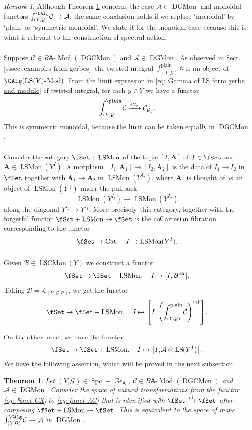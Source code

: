 \documentclass[10pt]{amsart}
\newcommand{\sssec}{\subsubsection}
\newtheorem{thm}[subsubsection]{Theorem}
\theoremstyle{remark}
\newtheorem{rmk}[subsubsection]{Remark}
\newcommand{\on}{\operatorname}
\newcommand{\cA}{\mathcal{A}}
\newcommand{\cB}{\mathcal{B}}
\newcommand{\cC}{\mathcal{C}}
\newcommand{\cG}{\mathcal{G}}
\newcommand{\cL}{\mathcal{L}}
\newcommand{\Cat}{\on{Cat}}
\newcommand{\LSMon}{\on{LSMon}}
\newcommand{\LSSymMon}{\on{LSCMon}}
\newcommand{\DGCatMon}{\on{DGMon}}
\newcommand{\DGCatSymMon}{\on{DGCMon}}
\newcommand{\lMod}{\text{-}\on{Mod}}
\newcommand{\LS}{\on{LS}}
\newcommand{\Spc}{\on{Spc}}
\newcommand{\id}{\on{id}}
\newcommand{\bA}{\mathbf{A}}
\newcommand{\sfA}{\mathsf{A}}
\begin{document}
\begin{rmk}
    Although Theorem \ref{thm: main categorical thm} concerns the case $\cA\in \DGCatMon$ and monoidal functors $\int^{\CAlg}_{(Y,\cG)}\cC\rightarrow\cA$, the same conclusion holds if we replace `monoidal' by `plain' or `symmetric monoidal'. We state it for the monoidal case because this is what is relevant to the construction of spectral action. 
\end{rmk}


\sssec{}
Suppose $\cC\in B\sfA\lMod(\DGCatSymMon)$ and $\cA\in \DGCatMon$. As observed in Sect. \ref{sssec: examples from gerbes}, the twisted integral $\int^{\on{plain}}_{(Y,\cG)}\cC$
is an object of $\CAlg(\LS(Y)\lMod)$. From the limit expression in \eqref{eq: Gamma of LS form gerbe and module} of twisted integral, for each $y\in Y$ we have a functor
\[\int^{\plain}_{(Y,\cG)}\cC\xrightarrow{\on{ev}_y}\cC_{\cG_y}.\]
This is symmetric monoidal, because the limit can be taken equally in $\DGCatSymMon$.


\sssec{}\label{sssec: fSet LSMon}
Consider the category $\fSet + \LSMon$ of the tuple $[I, \bA]$ of $I\in \fSet$ and $\bA\in \LSMon(Y^I)$. A morphism $[I_1, \bA_1]\rightarrow [I_2,\bA_2]$ is the data of $I_1\rightarrow I_2$ in $\fSet$ together with $\bA_1\rightarrow \bA_2$ in $\LSMon(Y^{I_2})$, where $\bA_1$ is thought of as an object of $\LSMon(Y^{I_2})$ under the pullback 
\[\LSMon(Y^{I_1})\rightarrow \LSMon(Y^{I_2})\]
along the diagonal $Y^{I_2}\rightarrow Y^{I_1}$. More precisely, this category, together with the forgetful functor $\fSet + \LSMon\rightarrow \fSet$ is the coCartesian fibration corresponding to the functor
\[\fSet\rightarrow \Cat,\quad I\mapsto \LSMon(Y^I).\]

\sssec{}\label{sssec: main cat thm prep}
Given $\cB\in \LSSymMon(Y)$ we construct a functor
\[\fSet\rightarrow \fSet + \LSMon,\quad I\mapsto [I, \cB^{\boxtimes I}].\]
Taking $\cB=\cL_{(Y,\cG,\cC)}$, we get the functor
\begin{equation}\label{eq: funct CX}
    \fSet\rightarrow \fSet + \LSMon, \quad I\mapsto \left[I, \left(\int^{\on{plain}}_{(Y,\cG)}\cC\right)^{\otimes I}\right].
\end{equation}

On the other hand, we have the functor
\begin{equation}\label{eq: funct AG}
    \fSet\rightarrow \fSet + \LSMon, \quad I\mapsto \left[ I, \cA\otimes\LS(Y^I) \right].
\end{equation}
We have the following assertion, which will be proved in the next subsection:
\begin{thm}\label{thm: main categorical thm}
    Let $(Y,\cG)\in \Spc+\on{Ge}_{\sfA}$, $\cC\in B\sfA\lMod(\DGCatSymMon)$ and $\cA\in\DGCatMon$. Consider the space of natural transformations from the functor \eqref{eq: funct CX} to \eqref{eq: funct AG} that is identified with $\fSet\xrightarrow{\id}\fSet$ after composing $\fSet+\LSMon\rightarrow \fSet$. This is equivalent to the space of maps $\int^{\CAlg}_{(Y,\cG)}\cC\rightarrow \cA$ in $\DGCatMon$. 
\end{thm}
\end{document}
